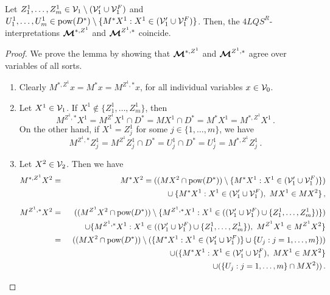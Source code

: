 \documentclass{fundam}
\newcommand{\model}{\ensuremath{\mbox{\boldmath $\mathcal{M}$}}\xspace}
\newcommand{\pow}{\mbox{\rm pow}}
\newcommand{\QLQSR}{\ensuremath{\mbox{$4\mathit{LQS}^{R}$}}\xspace}
\begin{document}
\begin{lemma}
\label{le_eqM*ZMZ*1}
Let $Z_{1}^1,\ldots,Z_{m}^1 \in {\cal V}_{1} \setminus ({\cal V}'_{1}
\cup {\cal V}_{1}^{F})$ and $U_{1}^1,\ldots,U_{m}^1 \in \pow(D^*)
\setminus \{M^{*}X^1 : X^1 \in ({\cal V}'_{1} \cup {\cal
V}_{1}^{F})\}$.  Then, the $\QLQSR$-interpretations $\model^{*,Z^1}$
and $\model^{Z^1,*}$ coincide.\end{lemma}
\begin{proof}
We prove the lemma by showing that $\model^{*,Z^1}$ and $\model^{Z^1,*}$ agree over variables of all sorts.

\begin{enumerate}
\item  Clearly $M^{*,Z^1}x = M^{*}x = M^{Z^1,*}x$, for
    all individual variables $x \in {\cal V}_{0}$.

\item
    Let $X^1 \in {\cal V}_{1}$.
    If $X^1 \notin \{Z_{1}^1,\ldots,Z_{m}^1\}$, then
    \[
    M^{Z^1,*}X^1 = M^{Z^1}X^1 \cap D^{*} = MX^1 \cap D^{*} = M^{*}X^1 = M^{*,Z^1}X^1\,.
    \]
    On the other hand, if $X^1 = Z_j^1$ for some $j \in \{1,\ldots, m\}$, we have
    \[
    M^{Z^1,*}Z_{j}^1 = M^{Z^1}Z_{j}^1 \cap D^{*} = U_{j}^1 \cap D^{*} = U_{j}^1
      =  M^{*,Z^1}Z_{j}^1\,.
    \]
\item
    Let $X^2 \in {\cal V}_{2}$.
    Then we have
    \begin{eqnarray}
        M^{*,Z^1}X^2 & = & M^{*}X^2 =
                        ((MX^2 \cap \pow(D^{*})) \setminus \{M^{*}X^1:
			X^1 \in ({\cal V}'_{1}\cup {\cal
			V}_{1}^{F})\}) \notag\\
                 &   &  \phantom{M^{*}A =} \qquad\cup \{M^{*}X^1: X^1
         \in ({\cal V}'_{1}\cup {\cal V}_{1}^{F}),~MX^1 \in
         MX^2\} \, , \label{a1}\\[.2cm]
    M^{Z^1,*}X^2 & = & ((M^{Z^1}X^2 \cap \pow(D^{*})) \setminus
                        \{M^{Z^1,*}X^1: X^1 \in (({\cal V}'_{1}\cup {\cal V}_{1}^{F}) \cup
                             \{Z_{1}^1,\ldots,Z_{m}^1\})\}) \notag\\
                 &   &  \qquad\cup \{M^{Z^1,*}X^1: X^1 \in (({\cal V}'_{1}\cup {\cal V}_{1}^{F}) \cup
                             \{Z_{1}^1,\ldots,Z_{m}^1\}),~M^{Z^1}X^1 \in M^{Z^1}X^2\} \notag\\
                 & = & ((MX^2 \cap \pow(D^{*})) \setminus
                        (\{M^{*}X^1: X^1 \in ({\cal V}'_{1}\cup {\cal V}_{1}^{F})\}  \cup
                        \{U_{j}: j = 1,\ldots,m \})) \notag\\
                 &   &  \qquad\cup (\{M^{*}X^1: X^1 \in ({\cal V}'_{1}\cup {\cal V}_{1}^{F}),~
		 MX^1 \in MX^2\}\notag\\
                 &   &  \qquad\cup (\{U_{j}: j = 1,\ldots,m\} \cap
		 MX^2))\,.\label{a2}
    \end{eqnarray}


\end{enumerate}
\end{proof}
\end{document}
